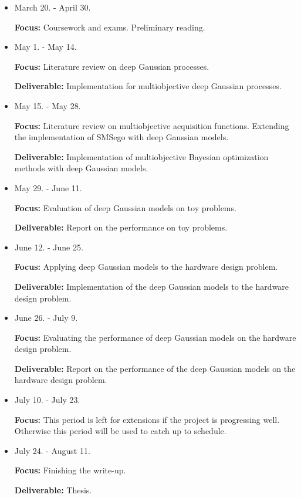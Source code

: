 \documentclass[a4paper, 11pt]{article}
\begin{document}
\begin{itemize}
\item March 20. - April 30.

\textbf{Focus:} Coursework and exams. Preliminary reading.

\item May 1. - May 14.

\textbf{Focus:} Literature review on deep Gaussian processes.

\textbf{Deliverable:} Implementation for multiobjective deep Gaussian processes.

\item May 15. - May 28.

\textbf{Focus:} Literature review on multiobjective acquisition functions. Extending the 
implementation of SMSego with deep Gaussian models.

\textbf{Deliverable:} Implementation of multiobjective Bayesian optimization methods with deep Gaussian models.

\item May 29. - June 11.

\textbf{Focus:} Evaluation of deep Gaussian models on toy problems.

\textbf{Deliverable:} Report on the performance on toy problems.

\item June 12. - June 25.

\textbf{Focus:} Applying deep Gaussian models to the hardware design problem.

\textbf{Deliverable:} Implementation of the deep Gaussian models to the hardware design problem.

\item June 26. - July 9.

\textbf{Focus:} Evaluating the performance of deep Gaussian models on the hardware design problem.

\textbf{Deliverable:} Report on the performance of the deep Gaussian models on the hardware design problem.

\item July 10. - July 23.

\textbf{Focus:} This period is left for extensions if the project is progressing well. Otherwise this period will be used to catch up to schedule.

\item July 24. - August 11.

\textbf{Focus:} Finishing the write-up.

\textbf{Deliverable:} Thesis.


\end{itemize}
\end{document}
